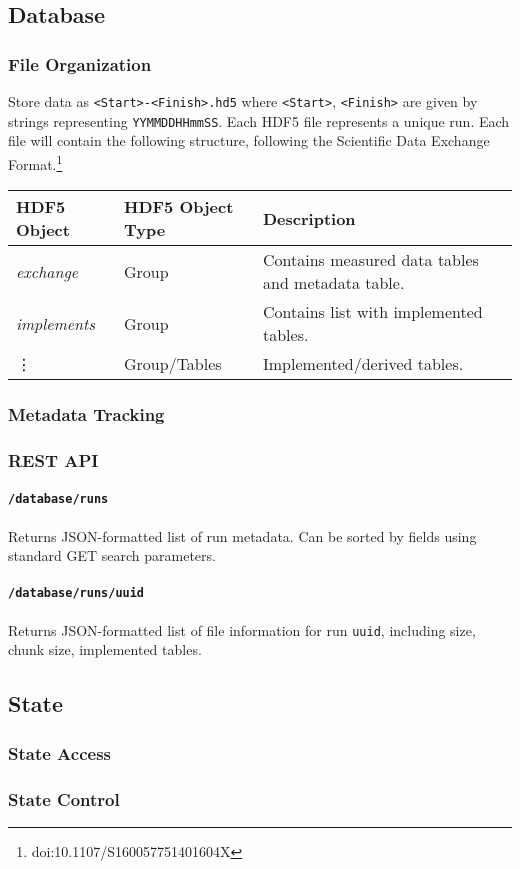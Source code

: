 \documentclass{article}
\begin{document}
\subsection{Database}
\subsubsection{File Organization}
Store data as \texttt{<Start>-<Finish>.hd5} where \texttt{<Start>}, \texttt{<Finish>} are given by strings representing \texttt{YYMMDDHHmmSS}.
Each HDF5 file represents a unique run.
Each file will contain the following structure, following the Scientific Data Exchange Format.\footnote{doi:10.1107/S160057751401604X}
\begin{center}
\begin{tabular}{l|ll}
	HDF5 Object	&	HDF5 Object Type	&	Description\\
	\hline
	\emph{exchange}	&	Group			&	Contains measured data tables and metadata table.
	\\
	\emph{implements}	& Group			&	Contains list with implemented tables.
	\\
	\vdots	&	Group/Tables	&	Implemented/derived tables.
\end{tabular}
\end{center}
\subsubsection{Metadata Tracking}
\subsubsection{REST API}


\paragraph{\texttt{/database/runs}} Returns JSON-formatted list of run metadata. Can be sorted by fields using standard GET search parameters.

\paragraph{\texttt{/database/runs/uuid}} Returns JSON-formatted list of file information for run \texttt{uuid}, including size, chunk size, implemented tables.
\subsection{State}
\subsubsection{State Access}
\subsubsection{State Control}
\end{document}
